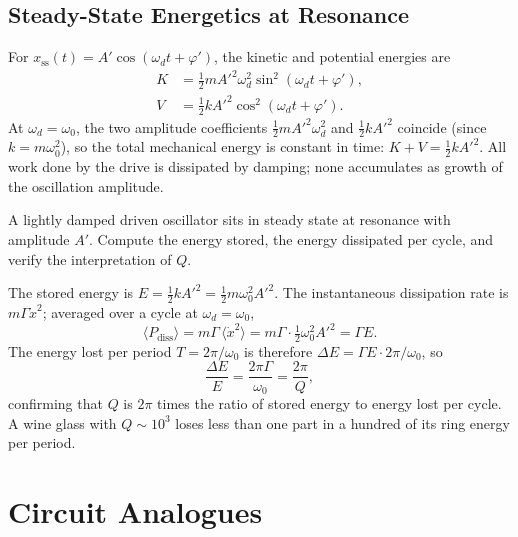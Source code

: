 \subsection{Steady-State Energetics at Resonance}

For $x_\text{ss}(t) = A'\cos(\omega_d t + \varphi')$, the kinetic and potential energies are
\begin{align}
    K &= \tfrac{1}{2}mA'^2\omega_d^2\sin^2(\omega_d t + \varphi'), \\
    V &= \tfrac{1}{2}kA'^2\cos^2(\omega_d t + \varphi').
\end{align}
At $\omega_d = \omega_0$, the two amplitude coefficients $\tfrac{1}{2}mA'^2\omega_d^2$ and $\tfrac{1}{2}kA'^2$ coincide (since $k = m\omega_0^2$), so the total mechanical energy is constant in time: $K + V = \tfrac{1}{2}kA'^2$. All work done by the drive is dissipated by damping; none accumulates as growth of the oscillation amplitude.

\begin{example}
A lightly damped driven oscillator sits in steady state at resonance with amplitude $A'$. Compute the energy stored, the energy dissipated per cycle, and verify the interpretation of $Q$.

The stored energy is $E = \tfrac{1}{2}kA'^2 = \tfrac{1}{2}m\omega_0^2 A'^2$. The instantaneous dissipation rate is $m\Gamma \dot{x}^2$; averaged over a cycle at $\omega_d = \omega_0$,
\begin{equation}
    \langle P_\text{diss}\rangle = m\Gamma\,\langle \dot{x}^2\rangle = m\Gamma\cdot\tfrac{1}{2}\omega_0^2 A'^2 = \Gamma E.
\end{equation}
The energy lost per period $T = 2\pi/\omega_0$ is therefore $\Delta E = \Gamma E\cdot 2\pi/\omega_0$, so
\begin{equation}
    \frac{\Delta E}{E} = \frac{2\pi\Gamma}{\omega_0} = \frac{2\pi}{Q},
\end{equation}
confirming that $Q$ is $2\pi$ times the ratio of stored energy to energy lost per cycle. A wine glass with $Q\sim 10^3$ loses less than one part in a hundred of its ring energy per period.
\end{example}

\section{Circuit Analogues}

